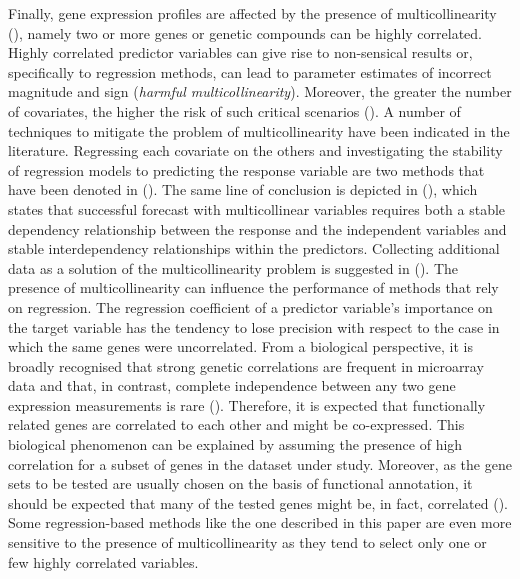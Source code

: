 Finally, gene expression profiles are affected by the presence of multicollinearity (\citealp{est_multicoll, ml_multicoll}), namely two or more genes or genetic compounds can be highly correlated. Highly correlated predictor variables can give rise to non-sensical results or, specifically to regression methods, can lead to parameter estimates of incorrect magnitude and sign (\emph{harmful multicollinearity}). Moreover, the greater the number of covariates, the higher the risk of such critical scenarios (\citealp{multicollinearity_kvs}).  
A number of techniques to mitigate the problem of multicollinearity have been indicated in the literature. Regressing each covariate on the others and investigating the stability of regression models to predicting the response variable are two methods that have been denoted in (\citealp{multicollinearity_kvs}). The same line of conclusion is depicted in (\citealp{farrar1964multicollinearity}), which states that successful forecast with multicollinear variables requires both a stable dependency relationship between the response and the independent variables and stable interdependency relationships within the predictors. Collecting additional data as a solution of the multicollinearity problem is suggested in (\citealp{multicollinearity_kvs, farrar1964multicollinearity}).
The presence of multicollinearity can influence the performance of methods that rely on regression. The regression coefficient of a predictor variable's importance on the target variable has the tendency to lose precision with respect to the case in which the same genes were uncorrelated. 
From a biological perspective, it is broadly recognised that strong genetic correlations are frequent in microarray data and that, in contrast, complete independence between any two gene expression measurements is rare (\citealp{genesets}). Therefore, it is expected that functionally related genes are correlated to each other and might be co-expressed. This biological phenomenon can be explained by assuming the presence of high correlation for a subset of genes in the dataset under study. Moreover, as the gene sets to be tested are usually chosen on the basis of functional annotation, it should be expected that many of the tested genes might be, in fact, correlated (\citealp{genesets}).
Some regression-based methods like the one described in this paper are even more sensitive to the presence of multicollinearity as they tend to select only one or few highly correlated variables.


